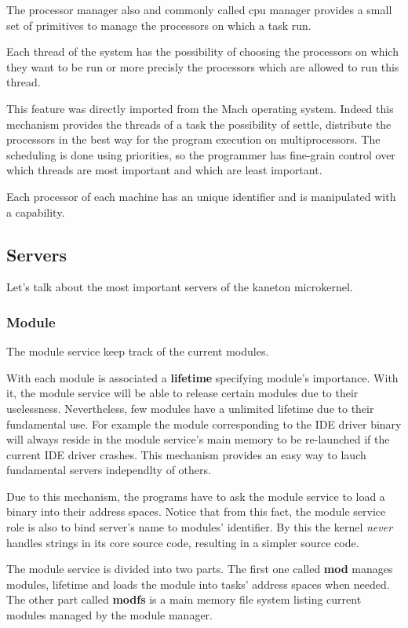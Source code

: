 \begin{multicols}{2}
The processor manager also and commonly called cpu manager provides a small
set of primitives to manage the processors on which a task run.

Each thread of the system has the possibility of choosing the processors
on which they want to be run or more precisly the processors which are allowed
to run this thread.

This feature was directly imported from the Mach operating system.
Indeed this mechanism provides the threads of a task the possibility of
settle, distribute the processors in the best way for the program
execution on multiprocessors. The scheduling is done using priorities,
so the programmer has fine-grain control over which threads
are most important and which are least important.

Each processor of each machine has an unique identifier and is manipulated
with a capability.

\subsection{Servers}

Let's talk about the most important servers of the kaneton microkernel.

\subsubsection{Module}

The module service keep track of the current modules.

With each module is associated a \textbf{lifetime} specifying module's
importance. With it, the module service will be able to release certain
modules due to their uselessness. Nevertheless, few modules have a
unlimited lifetime due to their fundamental use. For example the module
corresponding to the IDE driver binary will always reside in the module
service's main memory to be re-launched if the current IDE driver crashes.
This mechanism provides an easy way to lauch fundamental servers independlty
of others.

Due to this mechanism, the programs have to ask the module service to load
a binary into their address spaces. Notice that from this fact, the module
service role is also to bind server's name to modules' identifier. By this
the kernel \textit{never} handles strings in its core source code, resulting
in a simpler source code.

The module service is divided into two parts. The first one called \textbf{mod}
manages modules, lifetime and loads the module into tasks' address spaces
when needed. The other part called \textbf{modfs} is a main memory file
system listing current modules managed by the module manager.


\end{multicols}
